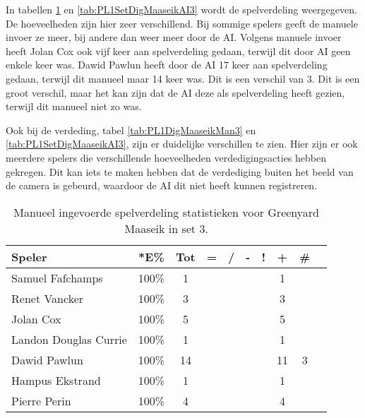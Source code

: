 In tabellen \ref{tab:PL1SetMaaseikMan3} en \ref{tab:PL1SetDigMaaseikAI3} wordt de spelverdeling weergegeven. De hoeveelheden zijn hier zeer verschillend. Bij sommige spelers geeft de manuele invoer ze meer, bij andere dan weer meer door de AI. Volgens manuele invoer heeft Jolan Cox ook vijf keer aan spelverdeling gedaan, terwijl dit door AI geen enkele keer was. Dawid Pawlun heeft door de AI 17 keer aan spelverdeling gedaan, terwijl dit manueel maar 14 keer was. Dit is een verschil van 3. Dit is een groot verschil, maar het kan zijn dat de AI deze als spelverdeling heeft gezien, terwijl dit manueel niet zo was.

Ook bij de verdeding, tabel \ref{tab:PL1DigMaaseikMan3} en \ref{tab:PL1SetDigMaaseikAI3}, zijn er duidelijke verschillen te zien. Hier zijn er ook meerdere spelers die verschillende hoeveelheden verdedigingsacties hebben gekregen. Dit kan iets te maken hebben dat de verdediging buiten het beeld van de camera is gebeurd, waardoor de AI dit niet heeft kunnen registreren.

\begin{table}[ht!]
    \centering
    \scriptsize
    \begin{tabular}{|l|c|c|c|c|c|c|c|c|c|} \hline
        \textbf{Speler} & *E\% & Tot & = & / & - & ! & + & \# \\ \hline
        Samuel Fafchamps  & 100\% & 1 &  &  &  &  & 1 &  \\ 
        Renet Vancker & 100\% & 3 &  &  &  &  & 3 &  \\
        Jolan Cox & 100\% & 5 &  &  &  &  & 5 &  \\ 
        Landon Douglas Currie & 100\% & 1 &  &  &  &  & 1 &  \\ 
        Dawid Pawlun & 100\% & 14 &  &  &  &  & 11 & 3 \\ 
        Hampus Ekstrand & 100\% & 1 &  &  &  &  & 1 &  \\
        Pierre Perin & 100\% & 4 &  &  &  &  & 4 &  \\ \hline
    \end{tabular}
    \caption[Manueel ingevoerde spelverdelingsstatistieken voor Greenyard Maaseik in set 3]{\label{tab:PL1SetMaaseikMan3}Manueel ingevoerde spelverdeling statistieken voor Greenyard Maaseik in set 3.}
\end{table}

